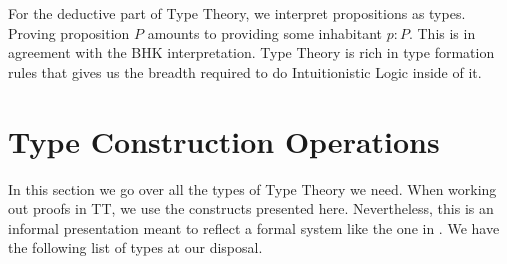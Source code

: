 \documentclass[12pt]{report}
\theoremstyle{definition}
\begin{document}
For the deductive part of Type Theory, we interpret propositions as types. 
Proving proposition $P$ amounts to providing some inhabitant $p : P$. 
This is in agreement with the BHK interpretation. 
Type Theory is rich in type formation rules that gives us the breadth required to do Intuitionistic Logic inside of it. 

\section{Type Construction Operations}\label{informalTT}
In this section we go over all the types of Type Theory we need. 
When working out proofs in TT, we use the constructs presented here. 
Nevertheless, this is an informal presentation meant to reflect a formal system like the one in . 
We have the following list of types at our disposal.
\end{document}
